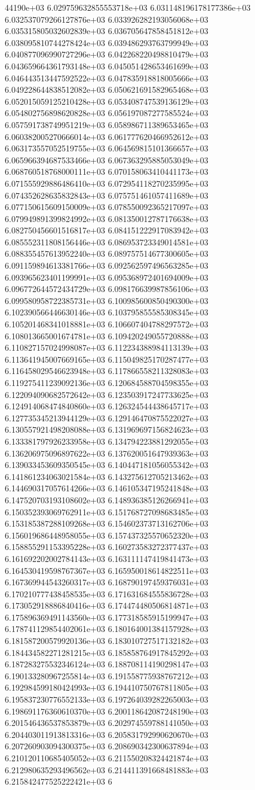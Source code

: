44190e+03	6.029759632855553718e+03	6.031148196178177386e+03	6.032537079266127876e+03	6.033926282193056068e+03	6.035315805032602839e+03	6.036705647858451812e+03	6.038095810744278424e+03	6.039486293763799949e+03	6.040877096990727296e+03	6.042268220498810479e+03	6.043659664361793148e+03	6.045051428653461699e+03	6.046443513447592522e+03	6.047835918818005666e+03	6.049228644838512082e+03	6.050621691582965468e+03	6.052015059125210428e+03	6.053408747539136129e+03	6.054802756898620828e+03	6.056197087277585524e+03	6.057591738749951219e+03	6.058986711389653465e+03	6.060382005270666014e+03	6.061777620466952612e+03	6.063173557052519755e+03	6.064569815101366657e+03	6.065966394687533466e+03	6.067363295885053049e+03	6.068760518768000111e+03	6.070158063410441173e+03	6.071555929886486410e+03	6.072954118270235995e+03	6.074352628635832843e+03	6.075751461057411689e+03	6.077150615609150009e+03	6.078550092365217097e+03	6.079949891399824992e+03	6.081350012787176638e+03	6.082750456601516817e+03	6.084151222917083942e+03	6.085552311808156446e+03	6.086953723349014581e+03	6.088355457613952240e+03	6.089757514677300605e+03	6.091159894613381766e+03	6.092562597496563285e+03	6.093965623401199991e+03	6.095368972401694009e+03	6.096772644572434729e+03	6.098176639987856106e+03	6.099580958722385731e+03	6.100985600850490300e+03	6.102390566446630146e+03	6.103795855585308345e+03	6.105201468341018881e+03	6.106607404788297572e+03	6.108013665001674781e+03	6.109420249055720888e+03	6.110827157024998087e+03	6.112234388984113139e+03	6.113641945007669165e+03	6.115049825170287477e+03	6.116458029546623948e+03	6.117866558211328083e+03	6.119275411239092136e+03	6.120684588704598355e+03	6.122094090682572642e+03	6.123503917247733625e+03	6.124914068474840860e+03	6.126324544438645717e+03	6.127735345213944129e+03	6.129146470875522027e+03	6.130557921498208088e+03	6.131969697156824623e+03	6.133381797926233958e+03	6.134794223881292055e+03	6.136206975096897622e+03	6.137620051647939363e+03	6.139033453609350545e+03	6.140447181056055342e+03	6.141861234063021584e+03	6.143275612705213462e+03	6.144690317057614266e+03	6.146105347195241848e+03	6.147520703193108602e+03	6.148936385126266941e+03	6.150352393069762911e+03	6.151768727098683485e+03	6.153185387288109268e+03	6.154602373713162706e+03	6.156019686448958055e+03	6.157437325570652320e+03	6.158855291153395228e+03	6.160273583272377437e+03	6.161692202002784143e+03	6.163111147419841473e+03	6.164530419598767367e+03	6.165950018614822511e+03	6.167369944543260317e+03	6.168790197459376031e+03	6.170210777438458535e+03	6.171631684555836728e+03	6.173052918886840416e+03	6.174474480506814871e+03	6.175896369491143560e+03	6.177318585915199947e+03	6.178741129854402061e+03	6.180164001384157928e+03	6.181587200579920136e+03	6.183010727517132182e+03	6.184434582271281215e+03	6.185858764917845292e+03	6.187283275532346124e+03	6.188708114190298147e+03	6.190133280967255814e+03	6.191558775938767212e+03	6.192984599180424993e+03	6.194410750767811805e+03	6.195837230776552133e+03	6.197264039282265003e+03	6.198691176360610370e+03	6.200118642087248190e+03	6.201546436537853879e+03	6.202974559788141050e+03	6.204403011913813316e+03	6.205831792990620670e+03	6.207260903094300375e+03	6.208690342300637894e+03	6.210120110685405052e+03	6.211550208324421874e+03	6.212980635293496562e+03	6.214411391668481883e+03	6.215842477525222421e+03	6